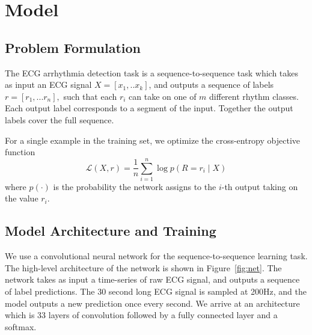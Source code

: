 \section{Model}
\label{sec:arrhythmia:model}

\subsection*{Problem Formulation}
The ECG arrhythmia detection task is a sequence-to-sequence task which takes as
input an ECG signal $X=[x_1,.. x_k]$, and outputs a sequence of labels $r=[r_1,
... r_n],$ such that each $r_i$ can take on one of $m$ different rhythm
classes. Each output label corresponds to a segment of the input. Together the
output labels cover the full sequence.

For a single example in the training set, we optimize the cross-entropy
objective function
\[
 \mathcal{L}(X, r) = \frac{1}{n} \sum_{i=1}^n \log p(R = r_i \mid X)
\]
where $p(\cdot)$ is the probability the network assigns to the $i$-th output
taking on the value $r_i$.

\subsection*{Model Architecture and Training}
We use a convolutional neural network for the sequence-to-sequence learning
task. The high-level architecture of the network is shown in
Figure~\ref{fig:net}. The network takes as input a time-series of raw ECG
signal, and outputs a sequence of label predictions. The 30 second long ECG
signal is sampled at 200Hz, and the model outputs a new prediction once every
second. We arrive at an architecture which is 33 layers of convolution followed
by a fully connected layer and a softmax. 

